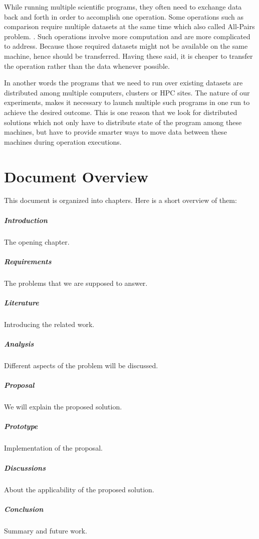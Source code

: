 While running multiple scientific programs, they often need to exchange data back and forth in order to accomplish one operation.
Some operations such as comparison require multiple datasets at the same time which also called All-Pairs problem. \cite{moretti08}. 
Such operations involve more computation and are more complicated to address. Because those required datasets 
might not be available on the same machine, hence should be transferred. 
Having these said, it is cheaper to transfer the operation rather than the data whenever possible. 

In another words the programs that we need to run over existing datasets are distributed among multiple
computers, clusters or HPC sites. The nature of our experiments, makes it necessary to launch
multiple such programs in one run to achieve the desired outcome. This is one reason that we look
for distributed solutions which not only have to distribute state of the program among these machines,
but have to provide smarter ways to move data between these machines during operation executions.

\section{Document Overview}
This document is organized into  chapters. Here is a short overview of them:
\subparagraph{Introduction} The opening chapter.
\subparagraph{Requirements} The problems that we are supposed to answer.
\subparagraph{Literature} Introducing the related work.
\subparagraph{Analysis} Different aspects of the problem will be discussed.
\subparagraph{Proposal} We will explain the proposed solution.
\subparagraph{Prototype} Implementation of the proposal.
\subparagraph{Discussions} About the applicability of the proposed solution.
\subparagraph{Conclusion} Summary and future work.